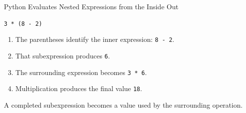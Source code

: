 \documentclass[aspectratio=169,10pt]{beamer}
\begin{document}
\begin{frame}{Python Evaluates Nested Expressions from the Inside Out}

  \begin{center}

    {\Large \texttt{3 * (8 - 2)}}

  \end{center}

  \vspace{0.08in}

  \begin{enumerate}

    \item The parentheses identify the inner expression: \texttt{8 - 2}.

    \item That subexpression produces \texttt{6}.

    \item The surrounding expression becomes \texttt{3 * 6}.

    \item Multiplication produces the final value \texttt{18}.

  \end{enumerate}

  \begin{keyidea}

    A completed subexpression becomes a value used by the surrounding operation.

  \end{keyidea}

\end{frame}
\end{document}
